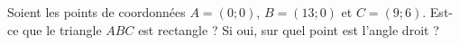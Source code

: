 
\begin{exercice}\label{exosmath-0029}

    Soient les points de coordonnées $A=(0;0)$, \( B=(13;0)\) et \( C=(9;6)\). Est-ce que le triangle \( ABC\) est rectangle ? Si oui, sur quel point est l'angle droit ?

\end{exercice}

